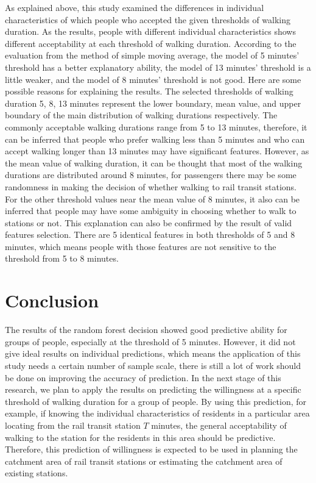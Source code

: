 %
As explained above, this study examined the differences in individual characteristics of which people who accepted the given thresholds of walking duration. As the results, people with different individual characteristics shows different acceptability at each threshold of walking duration. According to the evaluation from the method of simple moving average, the model of 5 minutes’ threshold has a better explanatory ability, the model of 13 minutes' threshold is a little weaker, and the model of 8 minutes' threshold is not good. Here are some possible reasons for explaining the results. The selected thresholds of walking duration 5, 8, 13 minutes represent the lower boundary, mean value, and upper boundary of the main distribution of walking durations respectively. The commonly acceptable walking durations range from 5 to 13 minutes, therefore, it can be inferred that people who prefer walking less than 5 minutes and who can accept walking longer than 13 minutes may have significant features. However, as the mean value of walking duration, it can be thought that most of the walking durations are distributed around 8 minutes, for passengers there may be some randomness in making the decision of whether walking to rail transit stations. For the other threshold values near the mean value of 8 minutes, it also can be inferred that people may have some ambiguity in choosing whether to walk to stations or not. This explanation can also be confirmed by the result of valid features selection. There are 5 identical features in both thresholds of 5 and 8 minutes, which means people with those features are not sensitive to the threshold from 5 to 8 minutes.

\section{Conclusion}
%
The results of the random forest decision showed good predictive ability for groups of people, especially at the threshold of 5 minutes. However, it did not give ideal results on individual predictions, which means the application of this study needs a certain number of sample scale, there is still a lot of work should be done on improving the accuracy of prediction. In the next stage of this research, we plan to apply the results on predicting the willingness at a specific threshold of walking duration for a group of people. By using this prediction, for example, if knowing the individual characteristics of residents in a particular area locating from the rail transit station $T$ minutes, the general acceptability of walking to the station for the residents in this area should be predictive. Therefore, this prediction of willingness is expected to be used in planning the catchment area of rail transit stations or estimating the catchment area of existing stations.

\clearpage %

% 
